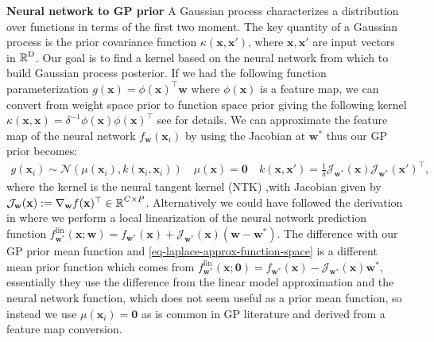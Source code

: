 \documentclass{article}
\newcommand{\weights}{\ensuremath{\mathbf{w}}}
\newcommand{\mbf}[1]{\mathbf{#1}}
\newcommand{\T}{\top}
\newcommand{\vzeros}{\mbf{0}}
\newcommand{\vx}{\mbf{x}}
\newcommand{\vw}{\mbf{w}}
\newcommand{\Jac}[2]{\mathcal{J}_{#1}(#2)}
\begin{document}
\textbf{Neural network to GP prior} A Gaussian process characterizes a distribution over functions in terms of the first two moment. The key quantity of a Gaussian process is the prior covariance function $\kappa(\vx,\vx')$, where $\vx, \vx'$ are input vectors in $\operatorname{\mathbb{R}}^{\mathrm{D}}$. Our goal is to find a kernel based on the neural network from which to build Gaussian process posterior. If we had the following function parameterization $g(\vx) = \phi(\vx)^\top \vw$ where $\phi(\vx)$ is a feature map, we can convert from weight space prior to function space prior giving the following kernel $\kappa(\vx, \vx) = \delta^{-1} \phi(\vx) \phi(\vx)^\T$ see \citep{rasmussen2006gaussian} for details. We can approximate the feature map of the neural network  $f_\weights(\mathbf{x}_{i})$  by using the Jacobian at $\weights^*$ thus our GP prior becomes:
\begin{align} \label{eq-laplace-approx-function-space}
 g(\vx_i) \sim \mathcal{N} \left( \mu(\vx_i), k(\vx_i, \vx_i) \right) \quad
  \mu(\vx)
  = \vzeros \quad
  k(\mathbf{x}, \mathbf{x}')
  = \frac{1}{\delta} \Jac{\weights^*}{\mathbf{x}}\Jac{\weights^*}{\mathbf{x}'}^\top,
\end{align}
where the kernel is the neural tangent kernel (NTK) ,with Jacobian given by $\Jac{\weights}{\mathbf{x}} := \nabla_\weights f(\mathbf{x})^\top \in \R^{C \times P}$. Alternatively we could have followed the derivation in \citet{immerImprovingPredictionsBayesian2021} where we perform a local linearization of the neural network prediction function $f^{\textrm{lin}}_{\vw^*}(\vx; \vw) = f_{\vw^*}(\vx) + \Jac{\weights^*}{\mathbf{x}} (\vw - \vw^*)$. The difference with our GP prior mean function and \cref{eq-laplace-approx-function-space} is a different mean prior function which comes from $f^{\textrm{lin}}_{\vw^*}(\vx; \vzeros) = f_{\vw^*}(\vx) - \Jac{\weights^*}{\mathbf{x}} \vw^*$, essentially they use the difference from the linear model approximation and the neural network function, which does not seem useful as a prior mean function, so instead we use $ \mu(\vx_i) = \vzeros$ as is common in GP literature and derived from a feature map conversion.
\end{document}
